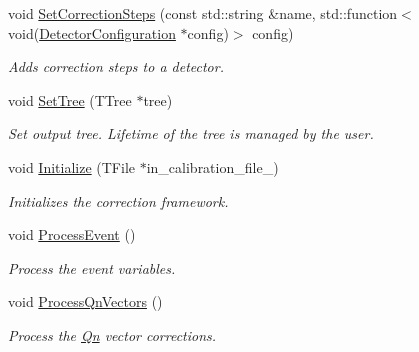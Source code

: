 \begin{DoxyCompactItemize}
\item 
void \mbox{\hyperlink{classQn_1_1CorrectionManager_afd73a6b73c0fae1da79c394328c86882}{Set\+Correction\+Steps}} (const std\+::string \&name, std\+::function$<$ void(\mbox{\hyperlink{classQn_1_1DetectorConfiguration}{Detector\+Configuration}} $\ast$config)$>$ config)
\begin{DoxyCompactList}\small\item\em Adds correction steps to a detector. \end{DoxyCompactList}\item 
void \mbox{\hyperlink{classQn_1_1CorrectionManager_adeb5d64691b7e5a05cdc2f4cdae71880}{Set\+Tree}} (T\+Tree $\ast$tree)
\begin{DoxyCompactList}\small\item\em Set output tree. Lifetime of the tree is managed by the user. \end{DoxyCompactList}\item 
void \mbox{\hyperlink{classQn_1_1CorrectionManager_a1514c4ed8e0dac7ab67fe07ca092a263}{Initialize}} (T\+File $\ast$in\+\_\+calibration\+\_\+file\+\_\+)
\begin{DoxyCompactList}\small\item\em Initializes the correction framework. \end{DoxyCompactList}\item 
\mbox{\label{classQn_1_1CorrectionManager_abc6554146be3c4120ad089bb73ebf6f6}} 
void \mbox{\hyperlink{classQn_1_1CorrectionManager_abc6554146be3c4120ad089bb73ebf6f6}{Process\+Event}} ()
\begin{DoxyCompactList}\small\item\em Process the event variables. \end{DoxyCompactList}\item 
\mbox{\label{classQn_1_1CorrectionManager_a90d4fb7a9d681cbef7d81547acb021f2}} 
void \mbox{\hyperlink{classQn_1_1CorrectionManager_a90d4fb7a9d681cbef7d81547acb021f2}{Process\+Qn\+Vectors}} ()
\begin{DoxyCompactList}\small\item\em Process the \mbox{\hyperlink{namespaceQn}{Qn}} vector corrections. \end{DoxyCompactList}\item 
\mbox{\label{classQn_1_1CorrectionManager_a9e1585bf2d191879219e02d55f65f622}} 

\end{DoxyCompactItemize}
